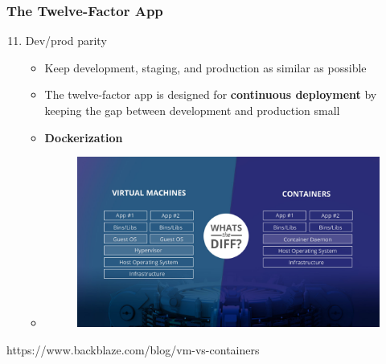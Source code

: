 \documentclass{beamer}
\begin{document}
	\begin{frame}
		\frametitle{The Twelve-Factor App}
		\begin{enumerate}
			\setcounter{enumi}{10}
			\item Dev/prod parity \\
			\begin{itemize}
				\item<1->[] \scriptsize{Keep development, staging, and production as similar as possible}
				\item<1-> \scriptsize {The twelve-factor app is designed for \textbf{continuous deployment} by keeping the gap between development and production small}
				\item<2-> \scriptsize {\textbf{Dockerization}}
				\vspace{2mm}
				\item<2->[] 
				\begin{figure}[h]
					\includegraphics[width=100mm,scale=1]{img/container-vs-vm.jpg}
				\end{figure}
			\end{itemize}
		\end{enumerate}
		\tiny{https://www.backblaze.com/blog/vm-vs-containers}
		\vspace{100mm}
	\end{frame}
\end{document}
